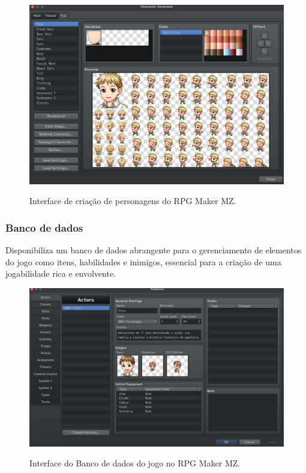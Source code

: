 \begin{figure}[ht]
	\centering
	\caption{Interface de criação de personagens do RPG Maker MZ.}
	\includegraphics[scale=0.3]{Textuais/Pictures/Picture5.png}
	\label{fig:rpgmaker-criador-personagens}
\end{figure}

\subsubsection*{Banco de dados}
Disponibiliza um banco de dados abrangente para o gerenciamento de elementos do jogo como itens, habilidades e inimigos, essencial para a criação de uma jogabilidade rica e envolvente.

\begin{figure}[ht]
	\centering
	\caption{Interface do Banco de dados do jogo no RPG Maker MZ.}
	\includegraphics[scale=0.3]{Textuais/Pictures/DataBase.png}
	\label{fig:rpgmaker-interface-database}
\end{figure}


